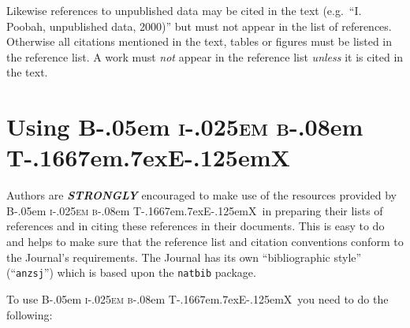 \documentclass[
  times,
  doublespace]{anzsauth}
\newcommand\BibTeX{{\rmfamily B\kern-.05em \textsc{i\kern-.025em b}\kern-.08em
T\kern-.1667em\lower.7ex\hbox{E}\kern-.125emX}}
\begin{document}
Likewise references to unpublished data may be cited in the text
(e.g.~``I. Poobah, unpublished data, 2000)'' but must not appear in the
list of references. Otherwise all citations mentioned in the text,
tables or figures must be listed in the reference list. A work must
\emph{not} appear in the reference list \emph{unless} it is cited in the
text.

\section{\texorpdfstring{Using \BibTeX~}{Using ~}}\label{sec-useBib}

Authors are \textbf{\emph{STRONGLY}} encouraged to make use of the
resources provided by \BibTeX~in preparing their lists of references and
in citing these references in their documents. This is easy to do and
helps to make sure that the reference list and citation conventions
conform to the Journal's requirements. The Journal has its own
``bibliographic style'' (``\texttt{anzsj}'') which is based upon the
\texttt{natbib} package.

To use \BibTeX~you need to do the following:
\end{document}
